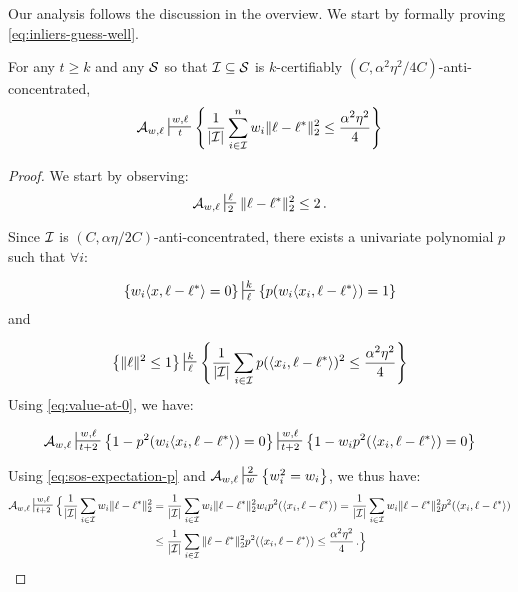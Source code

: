 Our analysis follows the discussion in the overview. 
We start by formally proving \eqref{eq:inliers-guess-well}. 

\begin{lemma}
For any $t \geq k$ and  any $\mathcal S$ so that $\mathcal I \subseteq \mathcal S$ is $k$-certifiably $(C,\alpha^2\eta^2/4C)$-anti-concentrated,
\[
\cA_{w,\ell} \sststile{t}{w,\ell} \Set{\frac{1}{|\cI|}\sum_{i \in \cI}^n w_i \|\ell - \ell^*\|^2_2\leq \frac{\alpha^2\eta^2}{4}}
\]
\label{lem:close-on-inliers}
\end{lemma}

\begin{proof}
We start by observing:
\[
\cA_{w,\ell} \sststile{2}{\ell} \|\ell - \ell^*\|_2^2 \leq 2 \mper
\]

Since $\mathcal I$ is $(C,\alpha \eta/2C)$-anti-concentrated, there exists a univariate polynomial $p$ such that $\forall i$:

\begin{equation}
\Set{w_i\iprod{x,\ell-\ell^*} = 0} \sststile{\ell}{k} \Set{p(w_i\iprod{x_i,\ell-\ell^*}) = 1} \label{eq:value-at-0}
\end{equation}
and 

\begin{equation} \label{eq:sos-expectation-p}
\Set{\|\ell\|^2 \leq 1} \sststile{\ell}{k} \Set{\frac{1}{|\cI|} \sum_{i \in \cI} p( \iprod{x_i,\ell-\ell^*})^2 \leq \frac{\alpha^2  \eta^2}{4}}
\end{equation}
Using \eqref{eq:value-at-0}, we have:

\begin{align*}
\cA_{w,\ell} \sststile{t+2}{w,\ell} \Set{ 1-p^2 (w_i \langle x_i, \ell - \ell^* \rangle) = 0} \sststile{t+2}{w,\ell} \Set{1- w_i p^2 (\langle x_i, \ell - \ell^* \rangle) = 0}\\
\end{align*}

Using \eqref{eq:sos-expectation-p} and $\cA_{w,\ell} \sststile{w}{2} \Set{w_i^2 = w_i}$, we thus have:
\begin{align*}
\cA_{w,\ell}  \sststile{t+2}{w,\ell} \Bigl\{ \frac{1}{|\cI|} \sum_{i \in \cI} w_i \|\ell-\ell^*\|_2^2 &= \frac{1}{|\cI|} \sum_{i \in \cI} w_i \|\ell-\ell^*\|_2^2 w_i p^2 (\langle x_i, \ell-\ell^* \rangle) 
= \frac{1}{|\cI|} \sum_{i \in \cI} w_i \|\ell-\ell^*\|_2^2 p^2 (\langle x_i, \ell-\ell^*\rangle) \\
&\leq \frac{1}{|\cI|} \sum_{i \in \cI} \|\ell-\ell^*\|_2^2 p^2 (\langle x_i, \ell-\ell^* \rangle)  \leq \frac{\alpha^2 \eta^2}{4} \mper
\Bigr\}
\end{align*}

\end{proof}



